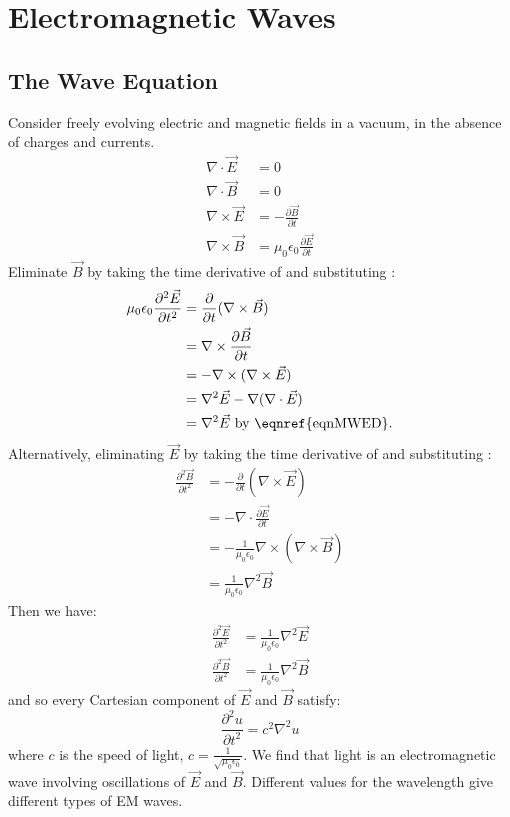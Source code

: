 \documentclass[../Main.tex]{subfiles}
\begin{document}
\section{Electromagnetic Waves}
\subsection{The Wave Equation}
Consider freely evolving electric and magnetic fields in a vacuum, in the absence of charges and currents.
\begin{align}
    \nabla \cdot \vec{E} &= 0 \label{eqnMWED} \\
    \nabla \cdot \vec{B} &= 0 \label{eqnMWBD} \\
    \nabla \times \vec{E} &= -\frac{\partial \vec{B}}{\partial t} \label{eqnMWEC} \\
    \nabla \times \vec{B} &= \mu_0 \epsilon_0 \frac{\partial \vec{E}}{\partial t} \label{eqnMWBC}
\end{align}
Eliminate $\vec{B}$ by taking the time derivative of  and substituting :
\begin{align*}
    \mu_0 \epsilon_0 \frac{\partial^{2}\vec{E}}{\partial t^{2}} &= \frac{\partial}{\partial t} (\nabla \times \vec{B}) \\
    &= \nabla \times \frac{\partial \vec{B}}{\partial t} \\
    &= - \nabla \times (\nabla \times \vec{E}) \\
    &= \nabla^2 \vec{E} - \nabla (\nabla \cdot \vec{E}) \\
    &= \nabla^2 \vec{E} \text{ by \eqnref{eqnMWED}}.
\end{align*}
Alternatively, eliminating $\vec{E}$ by taking the time derivative of  and substituting :
\begin{align*}
    \frac{\partial^{2}\vec{B}}{\partial t^{2}} &= - \frac{\partial}{\partial t} (\nabla \times \vec{E}) \\
    &= - \nabla \cdot \frac{\partial \vec{E}}{\partial t} \\
    &= - \frac{1}{\mu_0 \epsilon_0} \nabla \times (\nabla \times \vec{B}) \\
    &= \frac{1}{\mu_0 \epsilon_0} \nabla^2 \vec{B}
\end{align*}
Then we have:
\begin{align*}
    \frac{\partial^{2}\vec{E}}{\partial t^{2}} &= \frac{1}{\mu_0 \epsilon_0} \nabla^2 \vec{E} \\
    \frac{\partial^{2}\vec{B}}{\partial t^{2}} &= \frac{1}{\mu_0 \epsilon_0} \nabla^2 \vec{B}
\end{align*}
and so every Cartesian component of $\vec{E}$ and $\vec{B}$ satisfy:
\begin{equation*}
    \frac{\partial^{2}u}{\partial t^{2}} = c^2 \nabla^2 u
\end{equation*}
where $c$ is the speed of light, $c = \frac{1}{\sqrt{\mu_0 \epsilon_0}}$. We find that light is an electromagnetic wave involving oscillations of $\vec{E}$ and $\vec{B}$. Different values for the wavelength give different types of EM waves.
\end{document}
